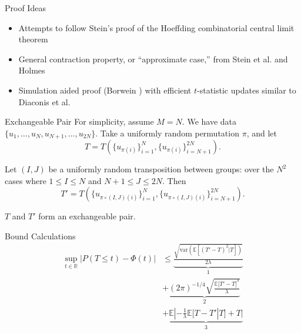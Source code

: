 \documentclass{beamer}
\newcommand{\var}{\mathrm{var}}
\newcommand{\E}{\mathbb{E}}
\begin{document}
\begin{frame}{Proof Ideas}
  \begin{itemize}
  \item  Attempts to follow Stein's \cite{stein1986approximate} 
    proof of the Hoeffding combinatorial central limit theorem \pause
  \item  General contraction property, or ``approximate case,''
    from Stein et al. \cite{stein2004use} and Holmes
    \cite{holmes2004stein} \pause
  \item Simulation aided proof (Borwein \cite{borwein2004mathematics}) 
    with efficient $t$-statistic updates similar to Diaconis et
    al. \cite{diaconis1994gray}
  \end{itemize}
\end{frame}

\begin{frame}{Exchangeable Pair}
  For simplicity, assume $M = N$.  We have data $\{u_1, \ldots, u_N,
  u_{N+1}, \ldots, u_{2N}\}$.  Take a uniformly random permutation
  $\pi$, and let 
  \begin{equation*}
    T = T \left (\{u_{\pi(i)}\}_{i=1}^{N},
      \{u_{\pi(i)}\}_{i=N+1}^{2N} \right).
  \end{equation*}
  \pause
  
  Let $(I, J)$ be a uniformly random transposition between groups:
  over the $N^2$ cases where $1 \leq I \leq N$ and $N + 1 \leq J \leq
  2N$. Then 
  \begin{equation*}
    T' = T \left (\{u_{\pi \circ (I, J) (i)}\}_{i=1}^{N},
      \{u_{\pi \circ (I, J) (i)}\}_{i=N+1}^{2N} \right).
  \end{equation*}

  $T$ and $T'$ form an exchangeable pair.
\end{frame}

\begin{frame}{Bound Calculations}
  \begin{align*}
    \sup_{t \in \mathbb{R}} |P(T \leq t) - \Phi(t)| &\leq 
  \underbrace{\frac{\sqrt{\var(\E[(T'-T)^2|T])}}{2\lambda}}_1 \\ &+ 
  \underbrace{(2\pi)^{-1/4}\sqrt{\frac{\E|T'-T|^3}{\lambda}}}_2 \\ &+ 
  \underbrace{\E|-\frac{1}{\lambda}\E[T-T'|T]+T|}_3
  \end{align*}
\end{frame}
\end{document}
